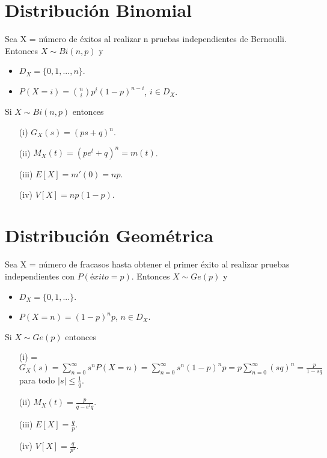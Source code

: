 \section{Distribución Binomial}

\begin{defi}
Sea X = número de éxitos al realizar n pruebas independientes de Bernoulli. Entonces $X \sim Bi(n,p)$ y 
\begin{itemize}
    \item $D_X = \{0,1,...,n\}$.
    \item $P(X = i) = \binom{n}{i}p^i(1-p)^{n-i}$, $i \in D_X$.
\end{itemize}
\end{defi}

\begin{obs}
Si $X \sim Bi(n,p)$ entonces
\begin{enumerate}
    \item[(i)] $G_X(s) = (ps + q)^n$.
    \item[(ii)] $M_X(t) = (pe^t + q)^n = m(t)$.
    \item[(iii)] $E[X] = m'(0) = np$.
    \item[(iv)] $V[X] = np(1 - p)$.
\end{enumerate}
\end{obs}

\section{Distribución Geométrica}

\begin{defi}
Sea X = número de fracasos hasta obtener el primer éxito al realizar pruebas independientes con $P(éxito = p)$. Entonces $X \sim Ge(p)$ y 
\begin{itemize}
    \item $D_X = \{0,1,...\}$.
    \item $P(X = n) = (1 - p)^np$, $n \in D_X$.
\end{itemize}
\end{defi}

\begin{obs}
Si $X \sim Ge(p)$ entonces
\begin{enumerate}
    \item[(i)] = $G_X(s) = \sum_{n=0}^{\infty}{s^nP(X = n)} = \sum_{n=0}^{\infty}{s^n(1-p)^np} = p\sum_{n=0}^{\infty}{(sq)^n} = \frac{p}{1 - sq}$ para todo $|s| \leq \frac{1}{q}$.
    \item[(ii)] $M_X(t) = \frac{p}{q - e^tq}$.
    \item[(iii)] $E[X] = \frac{q}{p}$.
    \item[(iv)] $V[X] = \frac{q}{p^2}$.
\end{enumerate}
\end{obs}

